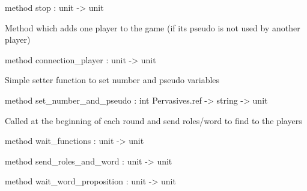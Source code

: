 \documentclass[11pt]{article}
\begin{document}
\begin{ocamldocobjectend}
\begin{ocamldocdescription}
\end{ocamldocdescription}


\label{method:Server.player.stop}\begin{ocamldoccode}
method stop : unit -> unit
\end{ocamldoccode}
\begin{ocamldocdescription}
Method which adds one player to the game (if its pseudo is not used by another player)


\end{ocamldocdescription}


\label{method:Server.player.connection-underscoreplayer}\begin{ocamldoccode}
method connection_player : unit -> unit
\end{ocamldoccode}
\begin{ocamldocdescription}
Simple setter function to set number and pseudo variables


\end{ocamldocdescription}


\label{method:Server.player.set-underscorenumber-underscoreand-underscorepseudo}\begin{ocamldoccode}
method set_number_and_pseudo : int Pervasives.ref -> string -> unit
\end{ocamldoccode}
\begin{ocamldocdescription}
Called at the beginning of each round and send roles/word to find to the players


\end{ocamldocdescription}


\label{method:Server.player.wait-underscorefunctions}\begin{ocamldoccode}
method wait_functions : unit -> unit
\end{ocamldoccode}


\label{method:Server.player.send-underscoreroles-underscoreand-underscoreword}\begin{ocamldoccode}
method send_roles_and_word : unit -> unit
\end{ocamldoccode}


\label{method:Server.player.wait-underscoreword-underscoreproposition}\begin{ocamldoccode}
method wait_word_proposition : unit -> unit
\end{ocamldoccode}



\end{ocamldocobjectend}
\end{document}
